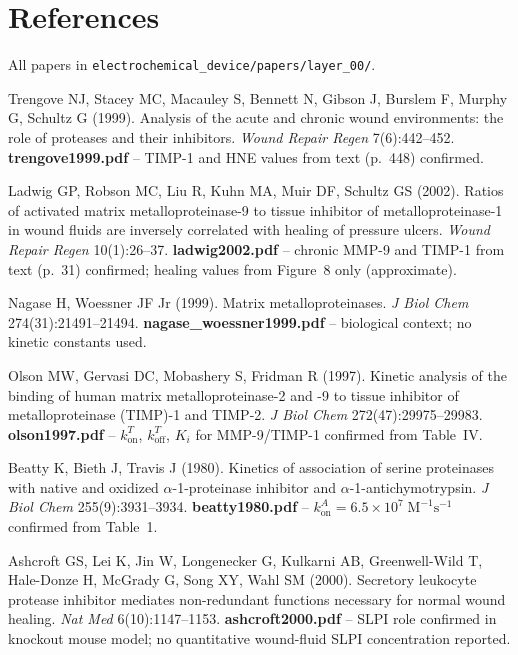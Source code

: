 \documentclass[10pt,a4paper]{article}
\numberwithin{equation}{section}
\newcommand{\kon}{k_{\text{on}}}
\newcommand{\koff}{k_{\text{off}}}
\newcommand{\Mms}{\text{M}^{-1}\text{s}^{-1}}
\begin{document}
\section*{References}

\noindent All papers in \texttt{electrochemical\_device/papers/layer\_00/}.

\begin{enumerate}[label={[\arabic*]},noitemsep,leftmargin=*]

\item Trengove NJ, Stacey MC, Macauley S, Bennett N, Gibson J, Burslem F, Murphy G,
  Schultz G (1999). Analysis of the acute and chronic wound environments: the role of
  proteases and their inhibitors. \textit{Wound Repair Regen} 7(6):442--452.
  \textbf{trengove1999.pdf} -- TIMP-1 and HNE values from text (p.~448) confirmed.

\item Ladwig GP, Robson MC, Liu R, Kuhn MA, Muir DF, Schultz GS (2002). Ratios of
  activated matrix metalloproteinase-9 to tissue inhibitor of metalloproteinase-1 in
  wound fluids are inversely correlated with healing of pressure ulcers.
  \textit{Wound Repair Regen} 10(1):26--37.
  \textbf{ladwig2002.pdf} -- chronic MMP-9 and TIMP-1 from text (p.~31) confirmed;
  healing values from Figure~8 only (approximate).

\item Nagase H, Woessner JF Jr (1999). Matrix metalloproteinases.
  \textit{J Biol Chem} 274(31):21491--21494.
  \textbf{nagase\_woessner1999.pdf} -- biological context; no kinetic constants used.

\item Olson MW, Gervasi DC, Mobashery S, Fridman R (1997). Kinetic analysis of the
  binding of human matrix metalloproteinase-2 and -9 to tissue inhibitor of
  metalloproteinase (TIMP)-1 and TIMP-2.
  \textit{J Biol Chem} 272(47):29975--29983.
  \textbf{olson1997.pdf} -- $\kon^T$, $\koff^T$, $K_i$ for MMP-9/TIMP-1 confirmed
  from Table~IV.

\item Beatty K, Bieth J, Travis J (1980). Kinetics of association of serine proteinases
  with native and oxidized $\alpha$-1-proteinase inhibitor and
  $\alpha$-1-antichymotrypsin.
  \textit{J Biol Chem} 255(9):3931--3934.
  \textbf{beatty1980.pdf} -- $\kon^A = 6.5 \times 10^7\;\Mms$ confirmed from Table~1.

\item Ashcroft GS, Lei K, Jin W, Longenecker G, Kulkarni AB, Greenwell-Wild T,
  Hale-Donze H, McGrady G, Song XY, Wahl SM (2000). Secretory leukocyte protease
  inhibitor mediates non-redundant functions necessary for normal wound healing.
  \textit{Nat Med} 6(10):1147--1153.
  \textbf{ashcroft2000.pdf} -- SLPI role confirmed in knockout mouse model; no
  quantitative wound-fluid SLPI concentration reported.


\end{enumerate}
\end{document}
